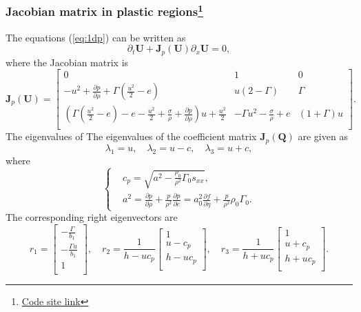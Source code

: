 \documentclass[review]{elsarticle}
\begin{document}
  \subsubsection{Jacobian matrix in  plastic  regions\footnote{\href{https://nbviewer.jupyter.org/github/bfly123/Exact-Elastic-plastic-Riemann-Solver-/blob/master/\%20CharacteristicForPlasticStateAfterYielding.ipynb\#}{Code site link}}}
  The equations (\ref{eq:1dp}) can be written as
\begin{equation}
  \partial_t \mathbf{{U}} + \mathbf{J}_p(\mathbf{U})\partial_x \mathbf{{U}}= 0,
\end{equation}
 where the Jacobian matrix is
\begin{equation}
\mathbf{J}_p(\mathbf{U}) = \left[\begin{array}{lll}
      0 & 1 & 0   \\
      -u^2 + \frac{\partial p}{\partial \rho} +\Gamma(\frac{u^2}{2}-e)& u(2-\Gamma)& \Gamma \\
	  (\Gamma(\frac{u^2}{2}-e)-e-\frac{u^2}{2}+\frac{\sigma}{\rho}+\frac{\partial p}{\partial \rho})u +\frac{u^2}{2} & -\Gamma u^2 -\frac{\sigma}{\rho} +e & (1+\Gamma)u\\
\end{array}
\right].
\end{equation} 
The eigenvalues of 
The eigenvalues of the coefficient matrix $\mathbf{J}_p(\mathbf{Q})$ are given as
$$\lambda_1 = u,\quad \lambda_2 = u-c, \quad \lambda_3 = u+c,$$
where 
\begin{equation}\label{eq:c_p}
  \left\{ \begin{aligned}
	  & c_p = \sqrt{a^2-\frac{\rho_0}{\rho^2}\Gamma_0 s_{xx}} ,\\
    &   a^2 = \frac{\partial p}{\partial \rho} + \frac{p}{\rho^2}\frac{\partial p}{\partial e} = a^2_0 \frac{\partial f}{\partial \eta} + \frac{p}{\rho^2}\rho_0 \Gamma_0.
      \end{aligned} \right.
    \end{equation}
The corresponding right eigenvectors are
\begin{equation}\label{eq:eivp}
  r_1 = \left[ \begin{array}{l}
	  -\frac{\Gamma}{b_1} \\
	  -\frac{\Gamma u}{b_1} \\
	  1\\
  \end{array}\right], \quad
  r_2 = \frac{1}{h-uc_p} \left[  \begin{array}{l}
	  1 \\
	  u-c_p \\
	  h-uc_p\\
  \end{array}\right], \quad
 r_3 = \frac{1}{h+uc_p}\left[ \begin{array}{l}
	  1 \\
	  u+c_p \\
	  h+uc_p\\
  \end{array}\right].
\end{equation}
\end{document}
